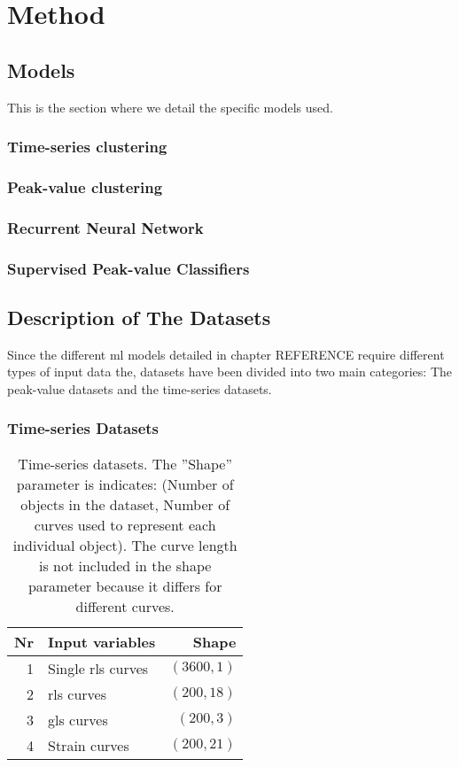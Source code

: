 \chapter{Method}

\section{Models} 
This is the section where we detail the specific models used. \bigskip

\subsection{Time-series clustering}

\subsection{Peak-value clustering}

\subsection{Recurrent Neural Network}

\subsection{Supervised Peak-value Classifiers}

\section{Description of The Datasets} \label{sec:datasets}

Since the different \acrshort{ml} models detailed in chapter REFERENCE require different types of input data the, datasets have been divided into two main categories: 
The peak-value datasets and the time-series datasets. \bigskip

\subsection{Time-series Datasets}

\begin{table*}[h]
    \centering
    \begin{tabular}{ rlr }
        \toprule
        Nr & Input variables   & Shape \\
        \midrule
        1  & Single \acrshort{rls} curves & $(3600,1)$ \\
        2  & \acrshort{rls} curves        & $(200,18)$ \\
        3  & \acrshort{gls} curves        & $(200,3)$  \\
        4  & Strain curves                & $(200,21)$ \\
        \bottomrule
    \end{tabular}
    \caption{Time-series datasets. The ''Shape'' parameter is indicates: (Number of objects in the dataset, Number of curves used to represent each individual object). The curve length is not included in the shape parameter because it differs for different curves.}
    \label{tab:ts_dsets}
\end{table*}

